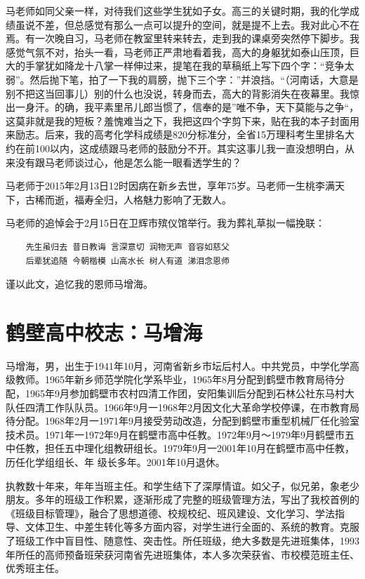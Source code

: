\documentclass[openany]{ctexbook}
\begin{document}
马老师如同父亲一样，对待我们这些学生犹如子女。高三的关键时期，我的化学成绩虽说不差，但总感觉有那么一点可以提升的空间，就是提不上去。我对此心不在焉。有一次晚自习，马老师在教室里转来转去，走到我的课桌旁突然停下脚步。我感觉气氛不对，抬头一看，马老师正严肃地看着我，高大的身躯犹如泰山压顶，巨大的手掌犹如降龙十八掌一样伸过来，提笔在我的草稿纸上写下四个字：``竞争太弱''。然后抛下笔，拍了一下我的肩膀，抛下三个字：''并浪挡。``（河南话，大意是别不把这当回事儿）别的什么也没说，转身而去，高大的背影消失在夜幕里。我惊出一身汗。的确，我平素里吊儿郎当惯了，信奉的是''唯不争，天下莫能与之争``，这莫非就是我的短板？羞愧难当之下，我把这四个字剪下来，贴在我的本子封面用来励志。后来，我的高考化学科成绩是820分标准分，全省15万理科考生里排名大约在前100以内，这成绩跟马老师的鼓励分不开。其实这事儿我一直没想明白，从来没有跟马老师谈过心，他是怎么能一眼看透学生的？

马老师于2015年2月13日12时因病在新乡去世，享年75岁。马老师一生桃李满天下，古稀而逝，福寿全归，人格魅力影响了无数人。

马老师的追悼会于2月15日在卫辉市殡仪馆举行。我为葬礼草拟一幅挽联：

\begin{verbatim}
    先生虽归去 昔日教诲 言深意切 润物无声 音容如慈父
    后辈犹追随 今朝楷模 山高水长 树人有道 涕泪念恩师
\end{verbatim}

谨以此文，追忆我的恩师马增海。

\chapter*{鹤壁高中校志：马增海}\label{master_ma_schoolbook}

马增海，男，出生于1941年10月，河南省新乡市坛后村人。中共党员，中学化学高级教师。1965年新乡师范学院化学系毕业，1965年8月分配到鹤壁市教育局待分配，1965年9月参加鹤壁市农村四清工作团，安阳集训后分配到石林公社东马村大队任四清工作队队员。1966年9月一1968年2月因文化大革命学校停课，在市教育局待分配。1968年2月一1971年9月接受劳动改造，分配到鹤壁市重型机械厂任化验室技术员。1971年一1972年9月在鹤壁市高中任教。1972年9月～1979年9月鹤壁市五中任教，担任五中理化组教研组长。1979年9月一2001年10月在鹤壁市高中任教，历任化学组组长、年
级长多年。2001年10月退休。

执教数十年来，年年当班主任。和学生结下了深厚情谊。如父子，似兄弟，象老少朋友。多年的班级工作积累，逐渐形成了完整的班级管理方法，写出了我校首例的《班级目标管理》，融合了思想道德、校规校纪、班风建设、文化学习、学法指导、文体卫生、中差生转化等多方面内容，对学生进行全面的、系统的教育。克服了班级工作中盲目性、随意性、突击性。所任班级，绝大多数是先进班集体，1993
年所任的高师预备班荣获河南省先进班集体，本人多次荣获省、市校模范班主任、优秀班主任。
\end{document}
